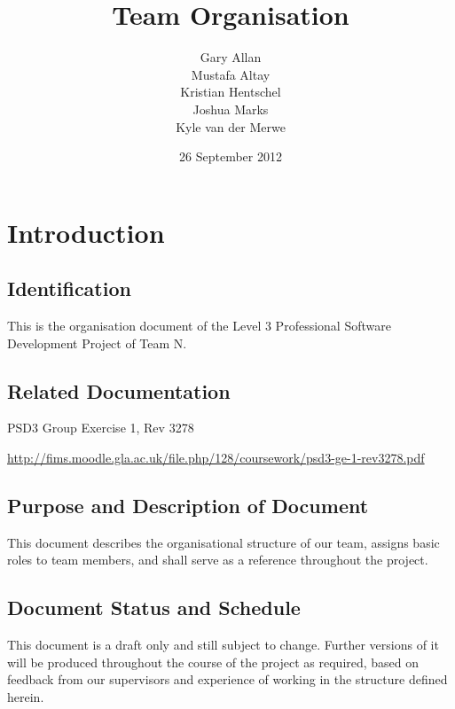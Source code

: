 \documentclass{l3deliverable}
\title{Team Organisation}
\author{
  Gary Allan\\
  Mustafa Altay\\
  Kristian Hentschel\\
  Joshua Marks\\
  Kyle van der Merwe\\
}
\date{26 September 2012}
\begin{document}

\maketitle


\section{Introduction}

\subsection{Identification}

This is the organisation document of the Level 3 Professional Software Development Project of Team N.

\subsection{Related Documentation}

\begin{list}{}{}
\item PSD3 Group Exercise 1, Rev 3278  \
  
  \url{http://fims.moodle.gla.ac.uk/file.php/128/coursework/psd3-ge-1-rev3278.pdf}
\end{list}
 

\subsection{Purpose and Description of Document}

This document describes the organisational structure of our team, assigns basic roles to team members, and shall serve as a reference throughout the project.

\subsection{Document Status and Schedule}

This document is a draft only and still subject to change. Further versions of it will be produced throughout the course of the project as required, based on feedback from our supervisors and experience of working in the structure defined herein.
\end{document}
